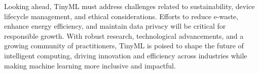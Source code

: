 \documentclass[twocolumn]{article}
\begin{document}
Looking ahead, TinyML must address challenges related to sustainability, device lifecycle management, and ethical considerations. Efforts to reduce e-waste, enhance energy efficiency, and maintain data privacy will be critical for responsible growth. With robust research, technological advancements, and a growing community of practitioners, TinyML is poised to shape the future of intelligent computing, driving innovation and efficiency across industries while making machine learning more inclusive and impactful.




\end{document}
